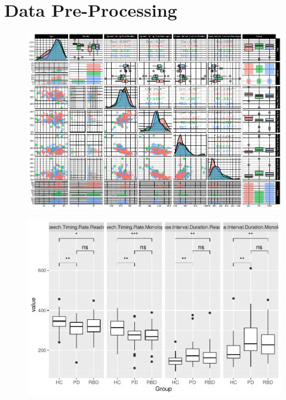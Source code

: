 \documentclass[
  english,
  doc,floatsintext]{apa6}
\begin{document}
\hypertarget{data-pre-processing}{%
\section{Data Pre-Processing}\label{data-pre-processing}}

\begin{figure}

{\centering \includegraphics{dap_report_anja_probst_files/figure-latex/intial-ggpairs-plot-1} 

}

\caption{ }\label{fig:intial-ggpairs-plot}
\end{figure}

\begin{figure}

{\centering \includegraphics{dap_report_anja_probst_files/figure-latex/boxplots-and-correlations-1} 

}

\caption{ }\label{fig:boxplots-and-correlations}
\end{figure}
\end{document}
